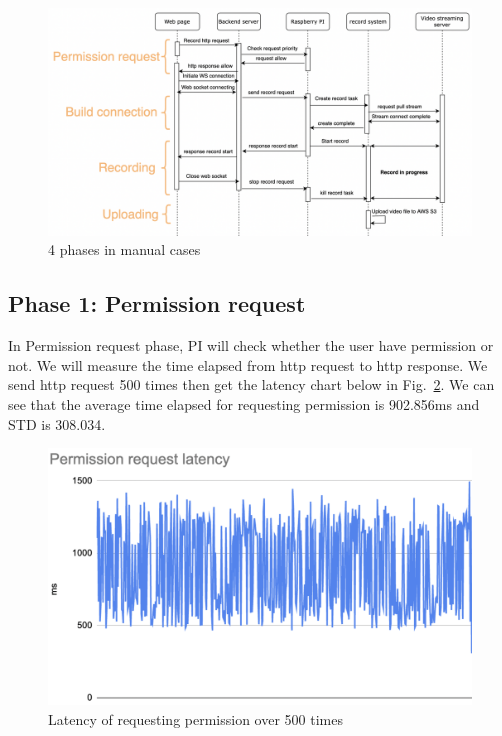 \begin{figure}[H]
    \centering
    \includegraphics[width=\textwidth]{figsrc/result-4phases.png}
    \caption{4 phases in manual cases\label{fig:result-4phases}}
\end{figure}

\subsection{Phase 1: Permission request}
In Permission request phase, PI will check whether the user have permission or not. We will measure the time elapsed from http request to http response. We send http request 500 times then get the latency chart below in Fig.~\ref{fig:result-p1}. We can see that the average time elapsed for requesting permission is 902.856ms and STD is 308.034.

\begin{figure}[H]
    \centering
    \includegraphics[width=\textwidth]{figsrc/result-p1.png}
    \caption{Latency of requesting permission over 500 times\label{fig:result-p1}}
\end{figure}

